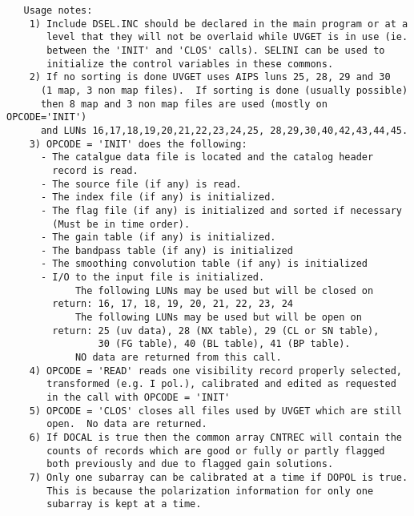 \begin{verbatim}
   Usage notes:
    1) Include DSEL.INC should be declared in the main program or at a
       level that they will not be overlaid while UVGET is in use (ie.
       between the 'INIT' and 'CLOS' calls). SELINI can be used to
       initialize the control variables in these commons.
    2) If no sorting is done UVGET uses AIPS luns 25, 28, 29 and 30
      (1 map, 3 non map files).  If sorting is done (usually possible)
      then 8 map and 3 non map files are used (mostly on OPCODE='INIT')
      and LUNs 16,17,18,19,20,21,22,23,24,25, 28,29,30,40,42,43,44,45.
    3) OPCODE = 'INIT' does the following:
      - The catalgue data file is located and the catalog header
        record is read.
      - The source file (if any) is read.
      - The index file (if any) is initialized.
      - The flag file (if any) is initialized and sorted if necessary
        (Must be in time order).
      - The gain table (if any) is initialized.
      - The bandpass table (if any) is initialized
      - The smoothing convolution table (if any) is initialized
      - I/O to the input file is initialized.
            The following LUNs may be used but will be closed on
        return: 16, 17, 18, 19, 20, 21, 22, 23, 24
            The following LUNs may be used but will be open on
        return: 25 (uv data), 28 (NX table), 29 (CL or SN table),
                30 (FG table), 40 (BL table), 41 (BP table).
            NO data are returned from this call.
    4) OPCODE = 'READ' reads one visibility record properly selected,
       transformed (e.g. I pol.), calibrated and edited as requested
       in the call with OPCODE = 'INIT'
    5) OPCODE = 'CLOS' closes all files used by UVGET which are still
       open.  No data are returned.
    6) If DOCAL is true then the common array CNTREC will contain the
       counts of records which are good or fully or partly flagged
       both previously and due to flagged gain solutions.
    7) Only one subarray can be calibrated at a time if DOPOL is true.
       This is because the polarization information for only one
       subarray is kept at a time.
\end{verbatim}

